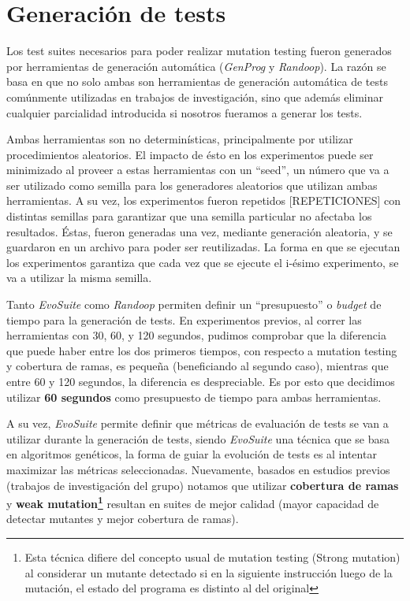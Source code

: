\section{Generaci\'on de tests}
\label{sec:evaluation.tests}

Los test suites necesarios para poder realizar mutation testing fueron generados por herramientas de generaci\'on autom\'atica (\emph{GenProg} y \emph{Randoop}). La raz\'on se basa en que no solo ambas son herramientas de generaci\'on autom\'atica de tests com\'unmente utilizadas en trabajos de investigaci\'on, sino que adem\'as eliminar cualquier parcialidad introducida si nosotros fueramos a generar los tests.

Ambas herramientas son no determin\'isticas, principalmente por utilizar procedimientos aleatorios. El impacto de \'esto en los experimentos puede ser minimizado al proveer a estas herramientas con un ``seed'', un n\'umero que va a ser utilizado como semilla para los generadores aleatorios que utilizan ambas herramientas. A su vez, los experimentos fueron repetidos [REPETICIONES] con distintas semillas para garantizar que una semilla particular no afectaba los resultados. \'Estas, fueron generadas una vez, mediante generaci\'on aleatoria, y se guardaron en un archivo para poder ser reutilizadas. La forma en que se ejecutan los experimentos garantiza que cada vez que se ejecute el i-\'esimo experimento, se va a utilizar la misma semilla.

Tanto \emph{EvoSuite} como \emph{Randoop} permiten definir un ``presupuesto'' o \emph{budget} de tiempo para la generaci\'on de tests. En experimentos previos, al correr las herramientas con 30, 60, y 120 segundos, pudimos comprobar que la diferencia que puede haber entre los dos primeros tiempos, con respecto a mutation testing y cobertura de ramas, es peque\~na (beneficiando al segundo caso), mientras que entre 60 y 120 segundos, la diferencia es despreciable. Es por esto que decidimos utilizar \textbf{60 segundos} como presupuesto de tiempo para ambas herramientas.

A su vez, \emph{EvoSuite} permite definir que m\'etricas de evaluaci\'on de tests se van a utilizar durante la generaci\'on de tests, siendo \emph{EvoSuite} una t\'ecnica que se basa en algoritmos gen\'eticos, la forma de guiar la evoluci\'on de tests es al intentar maximizar las m\'etricas seleccionadas. Nuevamente, basados en estudios previos (trabajos de investigaci\'on del grupo) notamos que utilizar \textbf{cobertura de ramas} y \textbf{weak mutation\footnote{Esta t\'ecnica difiere del concepto usual de mutation testing (Strong mutation) al considerar un mutante detectado si en la siguiente instrucci\'on luego de la mutaci\'on, el estado del programa es distinto al del original}} resultan en suites de mejor calidad (mayor capacidad de detectar mutantes y mejor cobertura de ramas).

